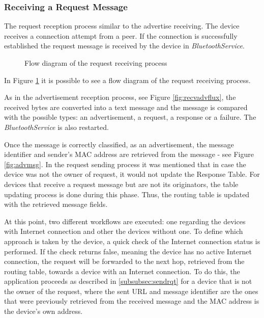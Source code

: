 \subsubsection{Receiving a Request Message}
\label{subsubsec:rcvrqt}

The request reception process similar to the advertise receiving. The device receives a connection attempt from a peer. If the connection is successfully established the request message is received by the device in \textit{BluetoothService}.


\begin{figure}[ht]
	\noindent{}
	\caption{\label{fig:rqtrcvflux} Flow diagram of the request receiving process}
\end{figure}

In Figure \ref{fig:rqtrcvflux} it is possible to see a flow diagram of the request receiving process.

As in the advertisement reception process, see Figure \ref{fig:recvadvflux}, the received bytes are converted into a text message and the message is compared with the possible types: an advertisement, a request, a response or a failure. The \textit{BluetoothService} is also restarted.

Once the message is correctly classified, as an advertisement, the message identifier and sender's \gls{MAC} address are retrieved from the message - see Figure \ref{fig:advmsg}. In the request sending process it was mentioned that in case the device was not the owner of request, it would not update the Response Table. For devices that receive a request message but are not its originators, the table updating process is done during this phase. Thus, the routing table is updated with the retrieved message fields.

At this point, two different workflows are executed: one regarding the devices with Internet connection and other the devices without one. To define which approach is taken by the device, a quick check of the Internet connection status is performed. If the check returns false, meaning the device has no active Internet connection, the request will be forwarded to the next hop, retrieved from the routing table, towards a device with an Internet connection. To do this, the application proceeds as described in \ref{subsubsec:sendrqt} for a device that is not the owner of the request, where the sent \gls{URL} and message identifier are the ones that were previously retrieved from the received message and the \gls{MAC} address is the device's own address.

